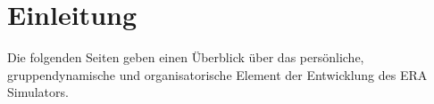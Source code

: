 
\section{Einleitung}

Die folgenden Seiten geben einen Überblick über das persönliche, gruppendynamische und organisatorische Element der Entwicklung des ERA Simulators.
